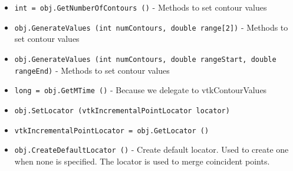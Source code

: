 \begin{itemize}
\item  \verb|int = obj.GetNumberOfContours ()| -  Methods to set contour values

\item  \verb|obj.GenerateValues (int numContours, double range[2])| -  Methods to set contour values

\item  \verb|obj.GenerateValues (int numContours, double rangeStart, double rangeEnd)| -  Methods to set contour values

\item  \verb|long = obj.GetMTime ()| -  Because we delegate to vtkContourValues

\item  \verb|obj.SetLocator (vtkIncrementalPointLocator locator)|

\item  \verb|vtkIncrementalPointLocator = obj.GetLocator ()|

\item  \verb|obj.CreateDefaultLocator ()| -  Create default locator. Used to create one when none is specified. 
 The locator is used to merge coincident points.

\end{itemize}
